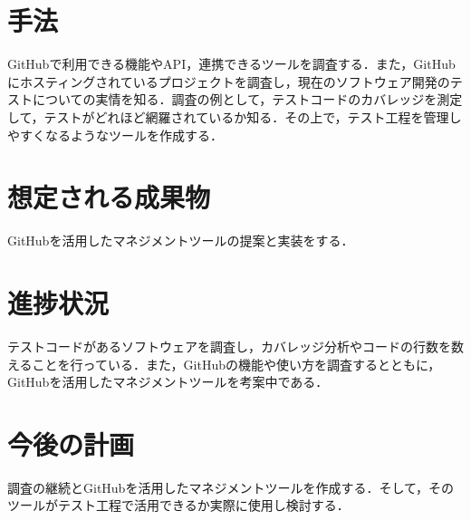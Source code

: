 \documentclass[uplatex,twocolumn,dvipdfmx]{jsarticle}
\begin{document}
\section{手法}

GitHubで利用できる機能やAPI，連携できるツールを調査する．また，GitHubにホスティングされているプロジェクトを調査し，現在のソフトウェア開発のテストについての実情を知る．調査の例として，テストコードのカバレッジを測定して，テストがどれほど網羅されているか知る．その上で，テスト工程を管理しやすくなるようなツールを作成する．

\section{想定される成果物}

GitHubを活用したマネジメントツールの提案と実装をする．

\section{進捗状況}

テストコードがあるソフトウェアを調査し，カバレッジ分析やコードの行数を数えることを行っている．また，GitHubの機能や使い方を調査するとともに，GitHubを活用したマネジメントツールを考案中である．

\section{今後の計画}

調査の継続とGitHubを活用したマネジメントツールを作成する．そして，そのツールがテスト工程で活用できるか実際に使用し検討する．


\end{document}
